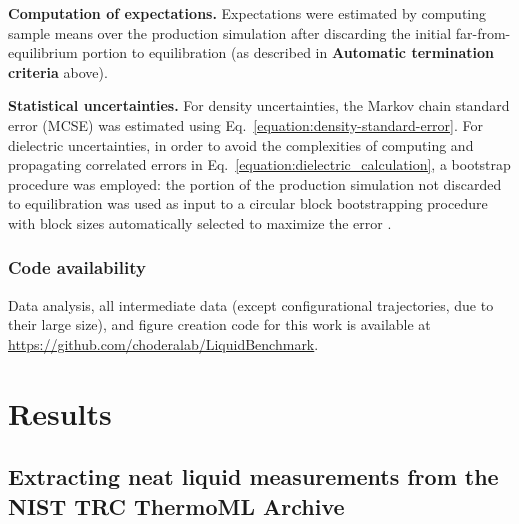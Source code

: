 \documentclass[aip, jcp, reprint]{revtex4-1}  %
\begin{document}
{\bf Computation of expectations.}
Expectations were estimated by computing sample means over the production simulation after discarding the initial far-from-equilibrium portion to equilibration (as described in {\bf Automatic termination criteria} above).

{\bf Statistical uncertainties.}
For density uncertainties, the Markov chain standard error (MCSE) was estimated using Eq.~\ref{equation:density-standard-error}.
For dielectric uncertainties, in order to avoid the complexities of computing and propagating correlated errors in Eq.~\ref{equation:dielectric_calculation}, a bootstrap procedure was employed: the portion of the production simulation not discarded to equilibration was used as input to a circular block bootstrapping procedure \cite{sheppard_2015_15681} with block sizes automatically selected to maximize the error \cite{flyvbjerg1989error}.

\subsubsection{Code availability}

Data analysis, all intermediate data (except configurational trajectories, due to their large size), and figure creation code for this work is available at \url{https://github.com/choderalab/LiquidBenchmark}.  


\section{Results}

\subsection{Extracting neat liquid measurements from the NIST TRC ThermoML Archive}
\label{section:filtering-thermoml}
\end{document}
